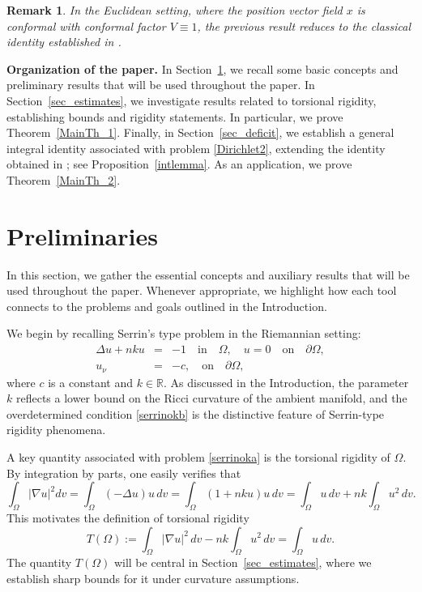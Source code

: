 \documentclass[reqno,11pt]{amsart}
\numberwithin{equation}{section}  %
\newtheorem{remark}[theorem]{Remark}
\begin{document}
\begin{remark}
In the Euclidean setting, where the position vector field $x$ is conformal with conformal factor $V\equiv 1$, the previous result reduces to the classical identity established in \cite[Theorem 2.1]{poggesi}.
\end{remark}

\textbf{Organization of the paper.}
In Section~\ref{sec_2}, we recall some basic concepts and preliminary results that will be used throughout the paper. In Section~\ref{sec_estimates}, we investigate results related to torsional rigidity, establishing bounds and rigidity statements. In particular, we prove Theorem~\ref{MainTh_1}. Finally, in Section~\ref{sec_deficit}, we establish a general integral identity associated with problem \eqref{Dirichlet2}, extending the identity obtained in \cite[Theorem 2.1]{poggesi}; see Proposition~\ref{intlemma}. As an application, we prove Theorem~\ref{MainTh_2}.



\section{Preliminaries}\label{sec_2}

In this section, we gather the essential concepts and auxiliary results that will be used throughout the paper. Whenever appropriate, we highlight how each tool connects to the problems and goals outlined in the Introduction.

We begin by recalling Serrin's type problem in the Riemannian setting:
\begin{eqnarray}
\Delta u + nku  &=& -1 \quad \text{in} \quad \Omega, \quad u = 0 \quad \text{on} \quad \partial \Omega, \label{serrinoka}\\
u_{\nu} &=& -c, \quad \text{on} \quad \partial \Omega, \label{serrinokb}    
\end{eqnarray}
where $c$ is a constant and $k\in\mathbb{R}$. As discussed in the Introduction, the parameter $k$ reflects a lower bound on the Ricci curvature of the ambient manifold, and the overdetermined condition \eqref{serrinokb} is the distinctive feature of Serrin-type rigidity phenomena.

A key quantity associated with problem \eqref{serrinoka} is the torsional rigidity of $\Omega$. By integration by parts, one easily verifies that
\[
\int_{\Omega} |\nabla u|^2dv = \int_{\Omega} (-\Delta u)  u \, dv = \int_{\Omega} (1 + n k u)  u \, dv= \int_{\Omega}  u \, dv + n k \int_{\Omega} u^2 \,dv.
\]
This motivates the definition of torsional rigidity
\begin{equation}\label{eqtorsion}
T(\Omega) := \int_{\Omega} |\nabla u|^2\, dv - n k \int_{\Omega} u^2\, dv = \int_{\Omega} u \, dv.
\end{equation}
The quantity $T(\Omega)$ will be central in Section~\ref{sec_estimates}, where we establish sharp bounds for it under curvature assumptions.
\end{document}
